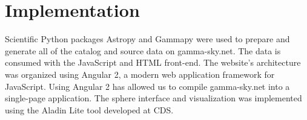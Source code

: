 \section{Implementation}

Scientific Python packages Astropy \cite{astropy} and Gammapy \cite{gammapy} were used to prepare and generate all of the catalog and source data on gamma-sky.net. The data is consumed with the JavaScript and HTML front-end. The website's architecture was organized using Angular 2, a modern web application framework for JavaScript. Using Angular 2 has allowed us to compile gamma-sky.net into a single-page application. The sphere interface and visualization was implemented using the Aladin Lite tool \cite{aladin-lite} developed at CDS.
